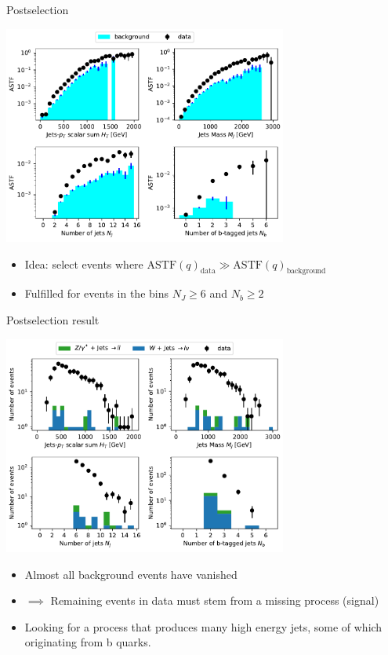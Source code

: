 \documentclass{beamer}
\begin{document}
\begin{frame}{Postselection}
\begin{center}
\includegraphics[width=0.7\textwidth]{astf.pdf}
\end{center}

\begin{itemize}
    \item<1-> Idea: select events where $\text{ASTF}(q)_{\text{data}} \gg \text{ASTF}(q)_{\text{background}}$
    \item<2-> Fulfilled for events in the bins $N_J\geq 6$ and $N_b\geq 2$
\end{itemize}
\end{frame}

\begin{frame}{Postselection result}
\begin{center}
\includegraphics[width=0.7\textwidth]{post_b.pdf}
\end{center}

\begin{itemize}
    \item<1-> Almost all background events have vanished
    \item<2-> $\implies$ Remaining events in data must stem from a missing process (signal)
    \item<3-> Looking for a process that produces many high energy jets, some of which originating from b quarks.
\end{itemize}
\end{frame}
\end{document}
